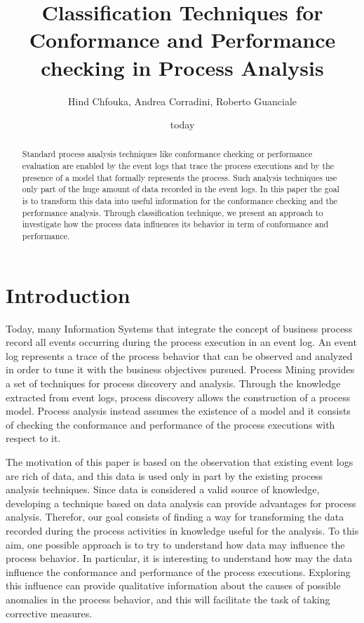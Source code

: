 \documentclass{llncs}
\title{Classification Techniques for Conformance and Performance checking in Process Analysis}
\author{Hind Chfouka, Andrea Corradini, Roberto Guanciale}
\institute{Department of Computer Science, Università di Pisa}
\date{today}
\begin{document}
\maketitle
\begin{abstract}
Standard process analysis techniques like conformance checking or performance evaluation are enabled by the event logs that trace the process executions and by the presence of a model that formally represents the process. Such analysis techniques use only part of the huge amount of data recorded in the event logs. In this paper the goal is to transform this data into useful information for the conformance checking and the performance analysis. Through classification technique, we present an approach to investigate how the process data influences its behavior in term of conformance and performance. 
\end{abstract}

\section{Introduction}

Today, many Information Systems that integrate the concept of business process record all events occurring during the process execution in an event log. An event log represents a trace of the process behavior that can be observed and analyzed in order to tune it with the business objectives pursued. Process Mining provides a set of techniques for process discovery and analysis. Through the knowledge extracted from event logs, process discovery allows the construction of a process model. Process analysis instead assumes the existence of a model and it consists of checking the conformance and performance of the process executions with respect to it.

The motivation of this paper is based on the observation that existing event logs are rich of data, and this data is used only in part by the existing process analysis techniques. Since data is considered a valid source of knowledge, developing a technique based on data analysis can provide advantages for  process analysis.
Therefor, our goal consists of finding a way for transforming the data recorded during the process activities in knowledge useful for the analysis. To this aim, one possible approach is to try to understand how data may influence the process behavior. In particular, it is interesting to understand how may the data influence the conformance and performance of the process executions. Exploring this influence can provide qualitative information about the causes of possible anomalies in the process behavior, and this will facilitate the task of taking corrective measures.
\end{document}
